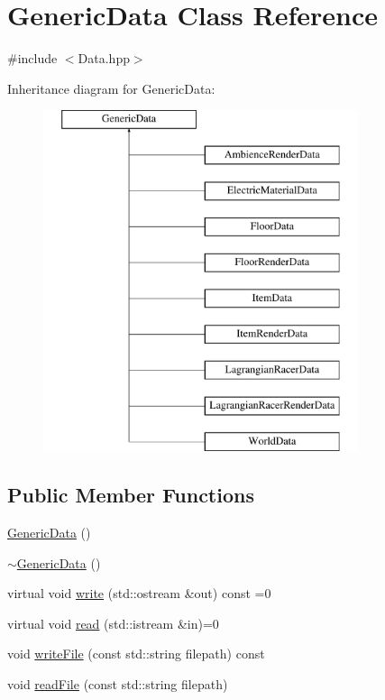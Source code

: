 \hypertarget{class_generic_data}{\section{Generic\-Data Class Reference}
\label{class_generic_data}
}


{\ttfamily \#include $<$Data.\-hpp$>$}

Inheritance diagram for Generic\-Data\-:\begin{figure}[H]
\begin{center}
\leavevmode
\includegraphics[height=10.000000cm]{class_generic_data}
\end{center}
\end{figure}
\subsection*{Public Member Functions}
\begin{DoxyCompactItemize}
\item 
\hyperlink{class_generic_data_a53d266970be68cd208cabbf1b029b96b}{Generic\-Data} ()
\item 
\hyperlink{class_generic_data_a9ab691aa9487309b2c4d9f5a0be19464}{$\sim$\-Generic\-Data} ()
\item 
virtual void \hyperlink{class_generic_data_a93ea61de5b09cf3fc95564ef3d841214}{write} (std\-::ostream \&out) const =0
\item 
virtual void \hyperlink{class_generic_data_a71e231ef04c9a91a3429123dab5bd1e7}{read} (std\-::istream \&in)=0
\item 
void \hyperlink{class_generic_data_ab2b2fb8564b784d61b99ab4f7fd95dc2}{write\-File} (const std\-::string filepath) const 
\item 
void \hyperlink{class_generic_data_a7d833405e216a292dc0655692df370e1}{read\-File} (const std\-::string filepath)
\end{DoxyCompactItemize}



